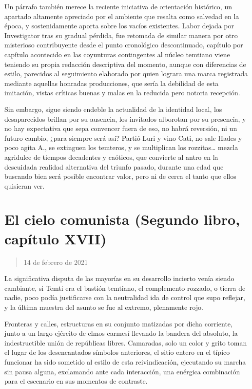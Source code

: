 \documentclass[
]{book}
\begin{document}
Un párrafo también merece la reciente iniciativa de orientación histórico, un apartado altamente apreciado por el ambiente que resalta como salvedad en la época, y sostenidamente aporta sobre los vacíos existentes. Labor dejada por Investigator tras su gradual pérdida, fue retomada de similar manera por otro misterioso contribuyente desde el punto cronológico descontinuado, capítulo por capítulo acontecido en las coyunturas contingentes al núcleo temtiano viene teniendo su propia redacción descriptiva del momento, aunque con diferencias de estilo, parecidos al seguimiento elaborado por quien lograra una marca registrada mediante aquellas honradas producciones, que sería la debilidad de esta imitación, vistas críticas buenas y malas en la reducida pero notoria recepción.

Sin embargo, sigue siendo endeble la actualidad de la identidad local, los desaparecidos brillan por su ausencia, los invitados alborotan por su presencia, y no hay expectativa que sepa convencer fuera de eso, no habrá reversión, ni un futuro cambio, ¿para siempre será así? Partió Luri y vino Cati, no sale Hades y poco agita A., se extinguen los temteros, y se multiplican los rozzitas\ldots{} mezcla agridulce de tiempos decadentes y caóticos, que convierte al antro en la descuidada realidad alternativa del triunfo pasado, durante una edad que buscando bien será posible encontrar valor, pero ni de cerca el tanto que ellos quisieran ver.

\hypertarget{el-cielo-comunista-segundo-libro-capuxedtulo-xvii}{%
\section{El cielo comunista (Segundo libro, capítulo XVII)}\label{el-cielo-comunista-segundo-libro-capuxedtulo-xvii}}

\begin{quote}
14 de febrero de 2021
\end{quote}

La significativa disputa de las mayorías en su desarrollo incierto venía siendo cambiante, si Temti era el bastión temtiano, el complemento rozzado, o tierra de nadie, poco podía justificarse con la neutralidad ida de control que supo reflejar, y la última muestra del asunto se fue al extremo, plenamente rojo.

Fronteras y calles, estructuras en su conjunto matizadas por dicha corriente, junto a un largo ejército de elmos carmesí llevando la bandera del absoluto, la indestructible unión de repúblicas libres. Camaradas, solo un color y grito toman el lugar de los desencantados símbolos anteriores, el sitio entero en el típico funcionar ha sido sometido al estilo de esta reivindicación, ejecutando su marcha sin pausa alguna, exclamando ante cada interacción, una enérgica combinación para el escenario en sus momentos de contraste.
\end{document}

